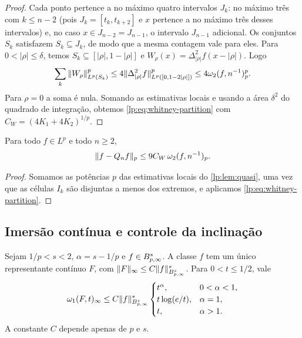\documentclass[12pt,a4paper]{article}
\begin{document}
\begin{proof}
Cada ponto pertence a no máximo quatro intervalos $J_k$: no máximo três com $k\le n-2$ (pois $J_k=[t_k,t_{k+2}]$ e $x$ pertence a no máximo três desses intervalos) e, no caso $x\in J_{n-2}=J_{n-1}$, o intervalo $J_{n-1}$ adicional. Os conjuntos $S_k$ satisfazem $S_k\subseteq J_k$, de modo que a mesma contagem vale para eles. Para $0<|\rho|\le\delta$, temos $S_k\subseteq[|\rho|,1-|\rho|]$ e $W_\rho(x)=\Delta_{|\rho|}^2f(x-|\rho|)$. Logo
\[
 \sum_k\|W_\rho\|_{L^p(S_k)}^p
 \le4\|\Delta_{|\rho|}^2f\|_{L^p([0,1-2|\rho|])}^p
 \le4\omega_2(f,n^{-1})_{p}^p .
\]
Para $\rho=0$ a soma é nula. Somando as estimativas locais e usando a área $\delta^2$ do quadrado de integração, obtemos \eqref{lp:eq:whitney-partition} com
$C_W=(4K_1+4K_2)^{1/p}$.
\end{proof}

\begin{corolario}
\label{lp:cor:quasi-error}
Para todo $f\in L^p$ e todo $n\ge2$,
\begin{equation}
 \|f-Q_nf\|_p\le9C_W\,\omega_2(f,n^{-1})_{p}.
 \label{lp:eq:quasi-error}
\end{equation}
\end{corolario}

\begin{proof}
Somamos as potências $p$ das estimativas locais do \cref{lp:lem:quasi}, uma vez que as células $I_k$ são disjuntas a menos dos extremos, e aplicamos \eqref{lp:eq:whitney-partition}.
\end{proof}

\subsection{Imersão contínua e controle da inclinação}

\begin{lema}
\label{lp:lem:embedding}
Sejam $1/p<s<2$, $\alpha=s-1/p$ e $f\in B^{s}_{p,\infty}$. A classe $f$ tem um único representante contínuo $F$, com
$\|F\|_\infty\le C\|f\|^*_{B^{s}_{p,\infty}}$. Para $0<t\le1/2$, vale
\begin{equation}
 \omega_1(F,t)_\infty
 \le C\|f\|^*_{B^{s}_{p,\infty}}
 \begin{cases}
 t^\alpha,&0<\alpha<1,\\
 t\log(e/t),&\alpha=1,\\
 t,&\alpha>1.
 \end{cases}
 \label{lp:eq:omega1-regimes}
\end{equation}
A constante $C$ depende apenas de $p$ e $s$.
\end{lema}
\end{document}
